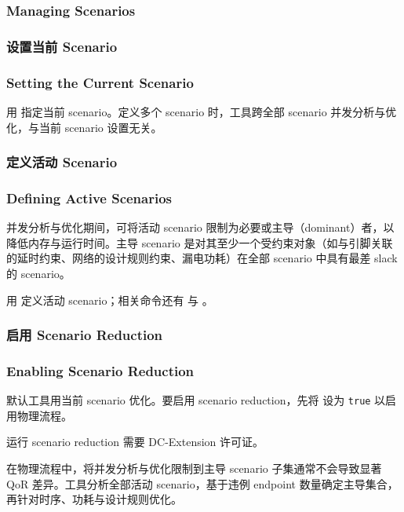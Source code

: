 \subsubsection*{Managing Scenarios}

\subsubsection{设置当前 Scenario}
\subsubsection*{Setting the Current Scenario}

用  指定当前 scenario。定义多个 scenario 时，工具跨全部 scenario 并发分析与优化，与当前 scenario 设置无关。

\subsubsection{定义活动 Scenario}
\subsubsection*{Defining Active Scenarios}

并发分析与优化期间，可将活动 scenario 限制为必要或主导（dominant）者，以降低内存与运行时间。主导 scenario 是对其至少一个受约束对象（如与引脚关联的延时约束、网络的设计规则约束、漏电功耗）在全部 scenario 中具有最差 slack 的 scenario。

用  定义活动 scenario；相关命令还有  与 。

\subsubsection{启用 Scenario Reduction}
\subsubsection*{Enabling Scenario Reduction}

默认工具用当前 scenario 优化。要启用 scenario reduction，先将  设为 \texttt{true} 以启用物理流程。

\begin{noteBox}
运行 scenario reduction 需要 DC-Extension 许可证。
\end{noteBox}

在物理流程中，将并发分析与优化限制到主导 scenario 子集通常不会导致显著 QoR 差异。工具分析全部活动 scenario，基于违例 endpoint 数量确定主导集合，再针对时序、功耗与设计规则优化。

